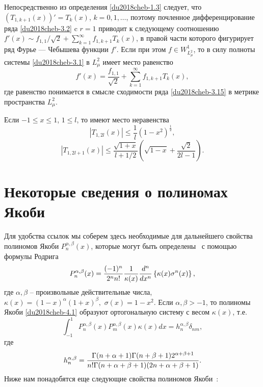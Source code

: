 Непосредственно из определения \eqref{du2018cheb-1.3} следует, что $(T_{1,k+1}(x))'=T_k(x)$, $k=0,1,\ldots$,
поэтому почленное дифференцирование ряда \eqref{du2018cheb-3.2} c $r=1$ приводит к следующему соотношению
$f'(x)\sim f_{1,1}/\sqrt{2} + \sum_{k=1}^\infty f_{1,k+1}T_k(x)$, в правой части которого фигурирует ряд Фурье --- Чебышева функции $f'$. Если при этом $f\in W^1_{L^2_\mu}$, то в силу полноты системы
\eqref{du2018cheb-3.1} в $L^2_\mu$ имеет место равенство
\begin{equation}\label{du2018cheb-3.15}
f'(x)= \frac{f_{1,1}}{\sqrt{2}} + \sum_{k=1}^\infty f_{1,k+1}T_k(x),
\end{equation}
где равенство понимается в смысле сходимости ряда \eqref{du2018cheb-3.15} в метрике пространства $L^2_\mu$.
\begin{theorem}\label{du2018cheb-th2}
	Если  $-1\le x\le1$, $1\le l$, то имеют место неравенства
	\begin{equation}\label{du2018cheb-3.16}
	|T_{1,2l}(x)|\le \frac{1}{l}(1-x^2)^\frac12,
	\end{equation}
	\begin{equation}\label{du2018cheb-3.17}
	|T_{1,2l+1}(x)|\le\frac{\sqrt{1+x}}{l+1/2}\left(\sqrt{1-x}+\frac{\sqrt{2}}{2l-1}\right).
	\end{equation}
\end{theorem}

\section{ Некоторые сведения о полиномах Якоби}

Для удобства ссылок мы соберем здесь необходимые для дальнейшего
свойства полиномов Якоби $P_n^{\alpha,\beta}(x)$, которые могут быть
определены~\cite{du2018cheb-Sege}  с помощью формулы Родрига
\begin{equation}\label{du2018cheb-4.1}
P_n^{\alpha,\beta}(x) = {(-1)^n\over2^nn!}{1\over\kappa(x)}{d^n\over
	dx^n} \left\{\kappa(x)\sigma^n(x)\right\},
\end{equation}
где $\alpha,\beta$ -- произвольные действительные числа, $\kappa(x)=
(1-x)^\alpha(1+x)^\beta,\,\,\sigma(x)=1-x^2$. Если
$\alpha,\beta>-1$, то полиномы Якоби \eqref{du2018cheb-4.1} образуют ортогональную
систему с весом $\kappa(x)$, т.е.
\begin{equation}\label{du2018cheb-4.2}
\int_{-1}^1P_n^{\alpha,\beta}(x)P_m^{\alpha,\beta}(x)\kappa(x)dx =
h_n^{\alpha,\beta}\delta_{nm},
\end{equation}
где
\begin{equation}\label{du2018cheb-4.3}
h_n^{\alpha,\beta} =
{\Gamma(n+\alpha+1)\Gamma(n+\beta+1)2^{\alpha+\beta+1} \over
	n!\Gamma(n+\alpha+\beta+1)(2n+\alpha+\beta+1)}.
\end{equation}
Ниже нам понадобятся еще следующие свойства полиномов
Якоби~\cite{du2018cheb-Sege}:


